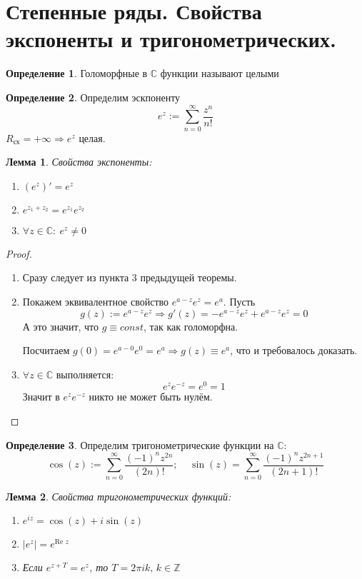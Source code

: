\documentclass[a4paper,12pt]{article}
\theoremstyle{plain}
\newtheorem{lemma}{Лемма}[section]
\theoremstyle{definition}
\newtheorem{definition}{Определение}[section]
\theoremstyle{remark}
\begin{document}
\section{Степенные ряды. Свойства экспоненты и тригонометрических.}
\begin{definition}
	Голоморфные в $\mathbb{C}$ функции называют целыми
\end{definition}

\begin{definition}
	Определим эскпоненту
	\[
		e^z := \sum_{n = 0}^\infty \frac{z^n}{n!}
	\]
	$R_\text{сх} = +\infty \Rightarrow e^z$ целая.
\end{definition}

\begin{lemma}
	Свойства экспоненты:
	\begin{enumerate}
		\item $(e^z)' = e^z$
		\item $e^{z_1 + z_2} = e^{z_1}e^{z_2}$
		\item $\forall z \in \mathbb{C} :\: e^z \neq 0$
	\end{enumerate}
\end{lemma}

\begin{proof}
	\begin{enumerate}
		\item Сразу следует из пункта 3 предыдущей теоремы.
		\item Покажем эквивалентное свойство $e^{a - z}e^z = e^a$. Пусть
		      \[
			      g(z) := e^{a - z}e^z \Rightarrow g'(z) = -e^{a - z}e^z + e^{a - z}e^z = 0
		      \]
		      А это значит, что $g \equiv const$, так как голоморфна.

		      Посчитаем $g(0) = e^{a - 0}e^0 = e^a \Rightarrow g(z) \equiv e^a$, что и требовалось доказать.
		\item $\forall z \in \mathbb{C}$ выполняется:
		      \[
			      e^ze^{-z} = e^0 = 1
		      \]
		      Значит в $e^ze^{-z}$ никто не может быть нулём.
	\end{enumerate}
\end{proof}

\begin{definition}
	Определим тригонометрические функции на $\mathbb{C}$:
	\[
		\cos(z) := \sum_{n = 0}^\infty \frac{(-1)^nz^{2n}}{(2n)!} ;\;\;\;\; \sin(z) = \sum_{n = 0}^\infty \frac{(-1)^nz^{2n + 1}}{(2n + 1)!}
	\]
\end{definition}

\begin{lemma}
	Свойства тригонометрических функций:
	\begin{enumerate}
		\item $e^{iz} = \cos(z) + i\sin(z)$
		\item $\vert e^z\vert = e^{\text{Re }z}$
		\item Если $e^{z + T} = e^z$, то $T = 2\pi ik,\, k \in \mathbb{Z}$
	\end{enumerate}
\end{lemma}
\end{document}
